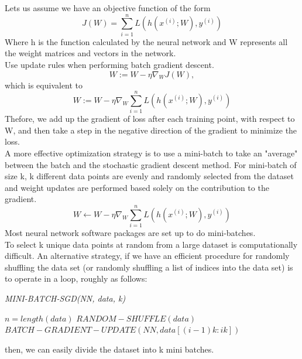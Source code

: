 Lets us assume we have an objective function of the form\\
\begin{equation*}
    J(W) = \sum_{i=1} ^n L(h(x^{(i)};W),y^{(i)})
\end{equation*}
Where h is the function calculated by the neural network and W represents all the weight matrices and vectors in the network. \\
 Use update rules when performing batch gradient descent.\\
\begin{equation*}
    W := W-\eta \nabla_W J(W), 
\end{equation*}
which is equivalent to 
\begin{equation*}
     W := W-\eta \nabla_W \sum_{i=1} ^n L(h(x^{(i)};W),y^{(i)})
\end{equation*}
Thefore, we add up the gradient of loss after each training point, with respect to W, and then take a step in the negative direction of the gradient to minimize the loss.\\


A more effective optimization strategy  is to use a mini-batch to take an "average" between the batch and the stochastic gradient descent method. For mini-batch of size k,  k different data points are evenly and randomly selected from the dataset and weight updates are performed based solely on the contribution to the gradient.
\begin{equation*}
    W \leftarrow W-\eta \nabla_W \sum_{i=1} ^n L(h(x^{(i)};W),y^{(i)})
\end{equation*}
Most neural network software packages are set up to do mini-batches\cite{25}.\\

To select k unique data points at random from a large dataset is computationally difficult. An alternative strategy, if we have an efficient procedure for randomly shuffling the data set (or randomly shuffling a list of indices into the data set) is to operate
in a loop, roughly as follows:\\
\begin{algorithm}
\caption{\textit{MINI-BATCH-SGD(NN, data, k)}}\label{alg:cap}
\begin{algorithmic}
\State $n = length(data)$
     \State $RANDOM-SHUFFLE(data)$
           \State $BATCH-GRADIENT-UPDATE(NN,data[(i-1)k:ik])$
\end{algorithmic}
\end{algorithm}
then, we can easily divide the dataset into k mini batches.

